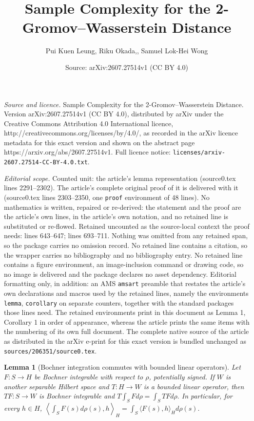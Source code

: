 \documentclass[10pt,a4paper]{amsart}
\title{Sample Complexity for the 2-Gromov--Wasserstein Distance}
\author{Pui Kuen Leung, Riku Okada,, Samuel Lok-Hei Wong}
\date{Source: arXiv:2607.27514v1 (CC BY 4.0)}
\newtheorem{lemma}{Lemma}
\begin{document}
\maketitle

\noindent\emph{Source and licence.} Sample Complexity for the 2-Gromov--Wasserstein Distance. Version arXiv:2607.27514v1 (CC BY 4.0), distributed by arXiv under the Creative Commons Attribution 4.0 International licence, http://creativecommons.org/licenses/by/4.0/, as recorded in the arXiv licence metadata for this exact version and shown on the abstract page https://arxiv.org/abs/2607.27514v1. Full licence notice: \texttt{licenses/arxiv-2607.27514-CC-BY-4.0.txt}.\par\smallskip

\noindent\textit{Editorial scope.} Counted unit: the article's lemma representation (source0.tex lines 2291--2302). The article's complete original proof of it is delivered with it (source0.tex lines 2303--2350, one \texttt{proof} environment of 48 lines). No mathematics is written, repaired or re-derived: the statement and the proof are the article's own lines, in the article's own notation, and no retained line is substituted or re-flowed.  Retained uncounted as the source-local context the proof needs: lines 643--647; lines 693--711.  Nothing was omitted from any retained span, so the package carries no omission record.  No retained line contains a citation, so the wrapper carries no bibliography and no bibliography entry.  No retained line contains a figure environment, an image-inclusion command or drawing code, so no image is delivered and the package declares no asset dependency.  Editorial formatting only, in addition: an AMS \texttt{amsart} preamble that restates the article's own declarations and macros used by the retained lines, namely the environments \texttt{lemma}, \texttt{corollary} on separate counters, together with the standard packages those lines need.  The retained environments print in this document as Lemma 1, Corollary 1 in order of appearance, whereas the article prints the same items with the numbering of its own full document.  The complete native source of the article as distributed in the arXiv e-print for this exact version is bundled unchanged as \texttt{sources/206351/source0.tex}.
\begin{lemma}[Bochner integration commutes with bounded linear operators]
\label{lem:Bochner}
Let $F:S\to H$ be Bochner integrable with respect to $\rho$, potentially signed. If $W$ is another separable Hilbert space and $T:H\to W$ is a bounded linear operator, then $TF:S\to W$ is Bochner integrable and $T\int_S Fd\rho=\int_S TFd\rho.$
In particular, for every $h\in H$, $\left\langle \int_S F(s)d\rho(s),h\right\rangle_H=\int_S \langle F(s),h\rangle_H d\rho(s).$
\end{lemma}
\end{document}
